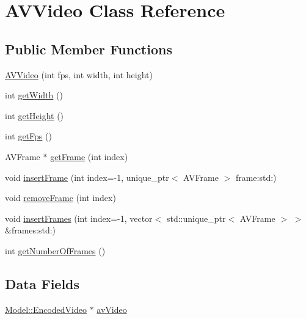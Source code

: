 \hypertarget{classModel_1_1AVVideo}{}\section{A\+V\+Video Class Reference}
\label{classModel_1_1AVVideo}
\subsection*{Public Member Functions}
\begin{DoxyCompactItemize}
\item 
\hyperlink{classModel_1_1AVVideo_af6a4a9766b45d8b9a6c10f0b6c5d8998}{A\+V\+Video} (int fps, int width, int height)
\item 
int \hyperlink{classModel_1_1AVVideo_a67a0997183f24da19b776d96c1052998}{get\+Width} ()
\item 
int \hyperlink{classModel_1_1AVVideo_a07efb2a4e9a982688c8bb3c3f21d1092}{get\+Height} ()
\item 
int \hyperlink{classModel_1_1AVVideo_a519ad5c0664b9de28c1a6d9dc77f959d}{get\+Fps} ()
\item 
A\+V\+Frame $\ast$ \hyperlink{classModel_1_1AVVideo_a5ae52bc55f8cdfa021eb1107beba5f61}{get\+Frame} (int index)
\item 
void \hyperlink{classModel_1_1AVVideo_ace104c676dbfe0dc570e75b8ed79c283}{insert\+Frame} (int index=-\/1, unique\+\_\+ptr$<$ A\+V\+Frame $>$ frame\+:std\+:)
\item 
void \hyperlink{classModel_1_1AVVideo_a2467a8d0c175fdcbacea59e9955d88a9}{remove\+Frame} (int index)
\item 
void \hyperlink{classModel_1_1AVVideo_af7a4bb4befc8330296b9765b4b23a7db}{insert\+Frames} (int index=-\/1, vector$<$ std\+::unique\+\_\+ptr$<$ A\+V\+Frame $>$ $>$ \&frames\+:std\+:)
\item 
int \hyperlink{classModel_1_1AVVideo_a038091d64aa83552571228512789d5ee}{get\+Number\+Of\+Frames} ()
\end{DoxyCompactItemize}
\subsection*{Data Fields}
\begin{DoxyCompactItemize}
\item 
\hyperlink{classModel_1_1EncodedVideo}{Model\+::\+Encoded\+Video} $\ast$ \hyperlink{classModel_1_1AVVideo_a2ee559c7a937231b8bdc36ed5a15d865}{av\+Video}
\end{DoxyCompactItemize}


